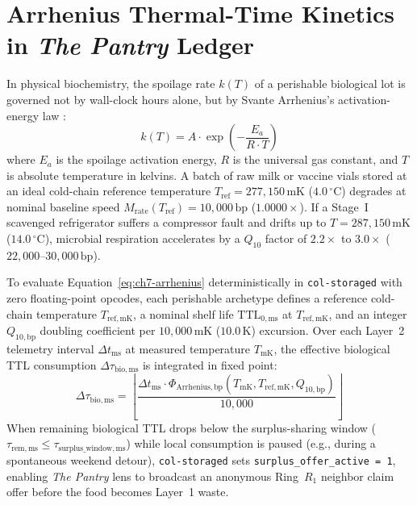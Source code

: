 \section{Arrhenius Thermal-Time Kinetics in \textit{The Pantry} Ledger}
\label{sec:ch7-arrhenius-kinetics}

In physical biochemistry, the spoilage rate $k(T)$ of a perishable biological lot is governed not by wall-clock hours alone, but by Svante Arrhenius's activation-energy law \parencite{arrhenius1889}:
\begin{equation}
k(T) = A \cdot \exp\left(-\frac{E_a}{R \cdot T}\right)
\label{eq:ch7-arrhenius}
\end{equation}
where $E_a$ is the spoilage activation energy, $R$ is the universal gas constant, and $T$ is absolute temperature in kelvins. A batch of raw milk or vaccine vials stored at an ideal cold-chain reference temperature $T_{\mathrm{ref}} = 277{,}150\,\mathrm{mK}$ ($4.0\,^\circ\mathrm{C}$) degrades at nominal baseline speed $M_{\mathrm{rate}}(T_{\mathrm{ref}}) = 10{,}000\,\mathrm{bp}$ ($1.0000\times$). If a Stage~I scavenged refrigerator suffers a compressor fault and drifts up to $T = 287{,}150\,\mathrm{mK}$ ($14.0\,^\circ\mathrm{C}$), microbial respiration accelerates by a $Q_{10}$ factor of $2.2\times$ to $3.0\times$ ($22{,}000\text{--}30{,}000\,\mathrm{bp}$).

To evaluate Equation~\eqref{eq:ch7-arrhenius} deterministically in \texttt{col-storaged} with zero floating-point opcodes, each perishable archetype defines a reference cold-chain temperature $T_{\mathrm{ref},\mathrm{mK}}$, a nominal shelf life $\mathrm{TTL}_{0,\mathrm{ms}}$ at $T_{\mathrm{ref},\mathrm{mK}}$, and an integer $Q_{10,\mathrm{bp}}$ doubling coefficient per $10{,}000\,\mathrm{mK}$ ($10.0\,\mathrm{K}$) excursion. Over each Layer~2 telemetry interval $\Delta t_{\mathrm{ms}}$ at measured temperature $T_{\mathrm{mK}}$, the effective biological TTL consumption $\Delta \tau_{\mathrm{bio},\mathrm{ms}}$ is integrated in fixed point:
\begin{equation}
\Delta \tau_{\mathrm{bio},\mathrm{ms}} = \left\lfloor \frac{\Delta t_{\mathrm{ms}} \cdot \Phi_{\mathrm{Arrhenius},\mathrm{bp}}(T_{\mathrm{mK}}, T_{\mathrm{ref},\mathrm{mK}}, Q_{10,\mathrm{bp}})}{10{,}000} \right\rfloor
\label{eq:ch7-arrhenius-fixed}
\end{equation}
When remaining biological TTL drops below the surplus-sharing window ($\tau_{\mathrm{rem},\mathrm{ms}} \le \tau_{\mathrm{surplus\_window},\mathrm{ms}}$) while local consumption is paused (e.g., during a spontaneous weekend detour), \texttt{col-storaged} sets \texttt{surplus\_offer\_active = 1}, enabling \textit{The Pantry} lens to broadcast an anonymous Ring~$R_1$ neighbor claim offer before the food becomes Layer~1 waste.

